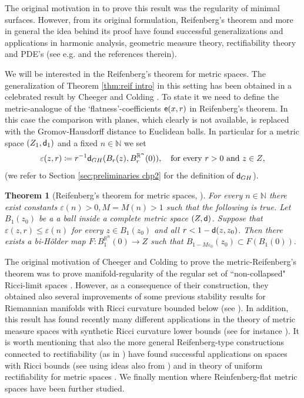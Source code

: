 \documentclass[11pt]{article}
\newcommand{\eps}{\varepsilon}
\newcommand{\rr}{\mathbb{R}}
\newcommand{\nn}{\mathbb{N}}
\newcommand{\sfd}{{\sf d}}
\newcommand{\ee}{{\sf e}}
\theoremstyle{plain}
\newtheorem{theorem}{Theorem}[section]
\theoremstyle{definition}
\numberwithin{equation}{section}
\begin{document}
The original motivation in \cite{r} to prove this result was the regularity of minimal surfaces. However, from its original formulation,  Reifenberg's theorem and more in general the idea behind its proof have found successful generalizations and applications in harmonic analysis, geometric measure theory, rectifiability theory and PDE's (see e.g. \cite{holes,nv,env,tolsa,tolsa2,DS,jones,badger,toro,Naberlectures} and the references therein).

We will be interested in the Reifenberg's theorem for metric spaces. The generalization of Theorem \ref{thm:reif intro} in this setting has been obtained in a celebrated result by Cheeger and Colding \cite[Appendix A]{Cheegercolding}.  To state it we need to define the metric-analogue of the `flatness'-coefficients $\ee(x,r)$ in Reifenberg's theorem. In this case the comparison with planes, which clearly is not available, is replaced with the Gromov-Hausdorff distance to Euclidean balls.  In particular for a metric space $(Z_1,\sfd_1)$ and a fixed $n \in \nn$ we set
\[
\eps(z,r)\coloneqq r^{-1}\sfd_{GH}(B_r(z),B_r^{\rr^n}(0)), \quad \text{for every $r>0$ and $z \in Z$,}
\]
(we refer to Section \ref{sec:preliminaries chp2} for the definition of $\sfd_{GH}$).





\begin{theorem}[{Reifenberg's theorem for metric spaces, \cite[Theorem A.1.2]{Cheegercolding}}]\label{localthmholder}
	For every $n \in \mathbb{N}$ there exist constants $\eps(n)>0, M=M(n)>1$ such that the following is true.  	Let $B_1(z_0)$ be a a ball inside a complete metric space $(Z,\sfd)$. Suppose that  $\eps(z,r) \le \eps(n)$ for every $z \in B_1(z_0)$ and all $r<1-\sfd(z,z_0)$. 
	Then there exists a   bi-H\"older map $F: B^{\rr^n}_1(0) \to Z $  such that $B_{1-M\eps_0}(z_0)\subset F(B_1(0)).$ 
\end{theorem}
The original motivation of Cheeger and Colding to prove the metric-Reifenberg's theorem was to prove manifold-regularity of the regular set of ``non-collapsed" Ricci-limit spaces \cite{Cheegercolding}. However, as a consequence of their construction, they obtained also several improvements of some previous stability results for Riemannian manifolds with Ricci curvature bounded below (see \cite{perelman,cosphere2,coconvergence}). In addition, this result has found recently many different applications in the theory of  metric measure spaces with synthetic Ricci curvature lower bounds (see for instance  \cite{ricci2,mk,boundary}).  It is worth  mentioning that also the more general Reifenberg-type constructions connected  to  rectifiability (as in \cite{nv}) have found successful applications on spaces with Ricci bounds (see \cite{cjn,boundary} using ideas also from \cite{NJ}) and in theory of uniform rectifiability for metric spaces \cite{BHS23}.   
We finally mention  \cite{snow}  where Reinfenberg-flat metric spaces have been further studied.
\end{document}
